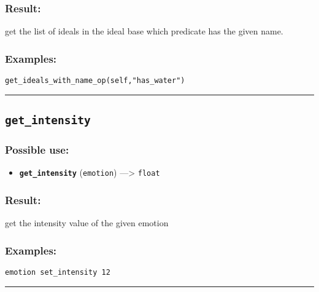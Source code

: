 \documentclass[]{book}
\providecommand{\tightlist}{%
  \setlength{\itemsep}{0pt}\setlength{\parskip}{0pt}}
\theoremstyle{definition}
\theoremstyle{definition}
\theoremstyle{definition}
\theoremstyle{remark}
\begin{document}
\subsubsection{Result:}\label{result-206}

get the list of ideals in the ideal base which predicate has the given
name.

\subsubsection{Examples:}\label{examples-159}

\begin{verbatim}
get_ideals_with_name_op(self,"has_water") 
\end{verbatim}

\begin{center}\rule{0.5\linewidth}{\linethickness}\end{center}

\subsection{\texorpdfstring{\texttt{get\_intensity}}{get\_intensity}}\label{get_intensity}

\subsubsection{Possible use:}\label{possible-use-213}

\begin{itemize}
\tightlist
\item
  \textbf{\texttt{get\_intensity}} (\texttt{emotion}) ---\textgreater{}
  \texttt{float}
\end{itemize}

\subsubsection{Result:}\label{result-207}

get the intensity value of the given emotion

\subsubsection{Examples:}\label{examples-160}

\begin{verbatim}
emotion set_intensity 12 
\end{verbatim}

\begin{center}\rule{0.5\linewidth}{\linethickness}\end{center}
\end{document}

